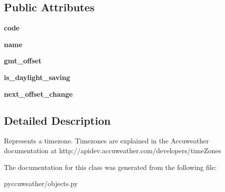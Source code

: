 \subsection*{Public Attributes}
\begin{DoxyCompactItemize}
\item 
\hypertarget{classpyccuweather_1_1objects_1_1_time_zone_ad196a0ffe0d0378730db111959633c11}{}{\bfseries code}\label{classpyccuweather_1_1objects_1_1_time_zone_ad196a0ffe0d0378730db111959633c11}

\item 
\hypertarget{classpyccuweather_1_1objects_1_1_time_zone_a7626838ea0694e8b9f051eec0d289232}{}{\bfseries name}\label{classpyccuweather_1_1objects_1_1_time_zone_a7626838ea0694e8b9f051eec0d289232}

\item 
\hypertarget{classpyccuweather_1_1objects_1_1_time_zone_af8b98b5d79da281d404871417b48e66d}{}{\bfseries gmt\+\_\+offset}\label{classpyccuweather_1_1objects_1_1_time_zone_af8b98b5d79da281d404871417b48e66d}

\item 
\hypertarget{classpyccuweather_1_1objects_1_1_time_zone_a36ec251ad356cc0eee6ac5bd98ddf7c3}{}{\bfseries is\+\_\+daylight\+\_\+saving}\label{classpyccuweather_1_1objects_1_1_time_zone_a36ec251ad356cc0eee6ac5bd98ddf7c3}

\item 
\hypertarget{classpyccuweather_1_1objects_1_1_time_zone_a605ebbe8b4027d75801c96cc50c65116}{}{\bfseries next\+\_\+offset\+\_\+change}\label{classpyccuweather_1_1objects_1_1_time_zone_a605ebbe8b4027d75801c96cc50c65116}

\end{DoxyCompactItemize}


\subsection{Detailed Description}
\begin{DoxyVerb}Represents a timezone.
Timezones are explained in the Accuweather documentation at http://apidev.accuweather.com/developers/timeZones
\end{DoxyVerb}
 

The documentation for this class was generated from the following file\+:\begin{DoxyCompactItemize}
\item 
pyccuweather/objects.\+py\end{DoxyCompactItemize}
